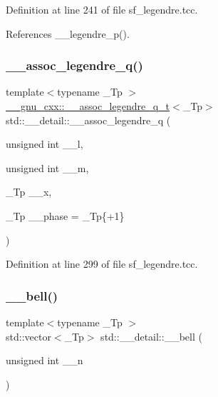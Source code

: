 Definition at line 241 of file sf\+\_\+legendre.\+tcc.



References \+\_\+\+\_\+legendre\+\_\+p().

\mbox{\label{namespacestd_1_1____detail_abc21e6e1aa5290b46dbec04a81d14eec}} 
\subsubsection{\texorpdfstring{\+\_\+\+\_\+assoc\+\_\+legendre\+\_\+q()}{\_\_assoc\_legendre\_q()}}
{\footnotesize\ttfamily template$<$typename \+\_\+\+Tp $>$ \\
\hyperlink{struct____gnu__cxx_1_1____assoc__legendre__q__t}{\+\_\+\+\_\+gnu\+\_\+cxx\+::\+\_\+\+\_\+assoc\+\_\+legendre\+\_\+q\+\_\+t}$<$\+\_\+\+Tp$>$ std\+::\+\_\+\+\_\+detail\+::\+\_\+\+\_\+assoc\+\_\+legendre\+\_\+q (\begin{DoxyParamCaption}\item[{unsigned int}]{\+\_\+\+\_\+l,  }\item[{unsigned int}]{\+\_\+\+\_\+m,  }\item[{\+\_\+\+Tp}]{\+\_\+\+\_\+x,  }\item[{\+\_\+\+Tp}]{\+\_\+\+\_\+phase = {\ttfamily \+\_\+Tp\{+1\}} }\end{DoxyParamCaption})}



Definition at line 299 of file sf\+\_\+legendre.\+tcc.

\mbox{\label{namespacestd_1_1____detail_ae2c2fdeec1af50db0d274cae70168dc9}} 
\subsubsection{\texorpdfstring{\+\_\+\+\_\+bell()}{\_\_bell()}\hspace{0.1cm}{\footnotesize\ttfamily [1/2]}}
{\footnotesize\ttfamily template$<$typename \+\_\+\+Tp $>$ \\
std\+::vector$<$\+\_\+\+Tp$>$ std\+::\+\_\+\+\_\+detail\+::\+\_\+\+\_\+bell (\begin{DoxyParamCaption}\item[{unsigned int}]{\+\_\+\+\_\+n }\end{DoxyParamCaption})\hspace{0.3cm}{\ttfamily [inline]}}

